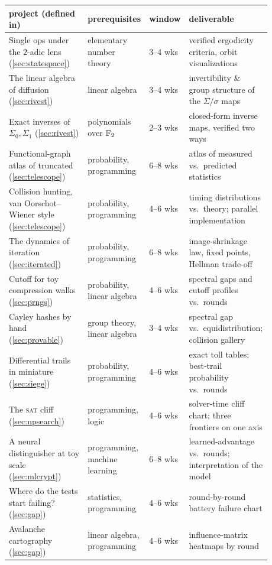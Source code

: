\begin{center}
\small
\begin{tabular}{@{}p{0.30\linewidth}p{0.22\linewidth}p{0.12\linewidth}p{0.24\linewidth}@{}}
  \toprule
  project (defined in) & prerequisites & window & deliverable \\
  \midrule
  Single ops under the $2$-adic lens (\cref{sec:statespace}) &
    elementary number theory & 3--4 wks &
    verified ergodicity criteria, orbit visualizations \\[2pt]
  The linear algebra of diffusion (\cref{sec:rivest}) &
    linear algebra & 3--4 wks &
    invertibility \& group structure of the $\Sigma/\sigma$ maps \\[2pt]
  Exact inverses of $\Sigma_0, \Sigma_1$ (\cref{sec:rivest}) &
    polynomials over $\mathbb{F}_2$ & 2--3 wks &
    closed-form inverse maps, verified two ways \\[2pt]
  Functional-graph atlas of truncated \SHA{} (\cref{sec:telescope}) &
    probability, programming & 6--8 wks &
    atlas of measured vs.\ predicted statistics \\[2pt]
  Collision hunting, van Oorschot--Wiener style (\cref{sec:telescope}) &
    probability, programming & 4--6 wks &
    timing distributions vs.\ theory; parallel implementation \\[2pt]
  The dynamics of iteration (\cref{sec:iterated}) &
    probability, programming & 6--8 wks &
    image-shrinkage law, fixed points, Hellman trade-off \\[2pt]
  Cutoff for toy compression walks (\cref{sec:prngs}) &
    probability, linear algebra & 4--6 wks &
    spectral gaps and cutoff profiles vs.\ rounds \\[2pt]
  Cayley hashes by hand (\cref{sec:provable}) &
    group theory, linear algebra & 3--4 wks &
    spectral gap vs.\ equidistribution; collision gallery \\[2pt]
  Differential trails in miniature (\cref{sec:siege}) &
    probability, programming & 4--6 wks &
    exact toll tables; best-trail probability vs.\ rounds \\[2pt]
  The \textsc{sat} cliff (\cref{sec:npsearch}) &
    programming, logic & 4--6 wks &
    solver-time cliff chart; three frontiers on one axis \\[2pt]
  A neural distinguisher at toy scale (\cref{sec:mlcrypt}) &
    programming, machine learning & 6--8 wks &
    learned-advantage vs.\ rounds; interpretation of the model \\[2pt]
  Where do the tests start failing? (\cref{sec:gap}) &
    statistics, programming & 4--6 wks &
    round-by-round battery failure chart \\[2pt]
  Avalanche cartography (\cref{sec:gap}) &
    linear algebra, programming & 4--6 wks &
    influence-matrix heatmaps by round \\
  \bottomrule
\end{tabular}
\end{center}

